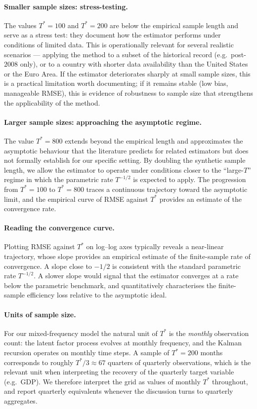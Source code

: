 \documentclass[11pt, a4paper, oneside]{article}
\begin{document}
\paragraph{Smaller sample sizes: stress-testing.}
The values $T^* = 100$ and $T^* = 200$ are below the empirical
sample length and serve as a stress test: they document how the
estimator performs under conditions of limited data. This is
operationally relevant for several realistic scenarios — applying
the method to a subset of the historical record (e.g.\ post-$2008$
only), or to a country with shorter data availability than the
United States or the Euro Area. If the estimator deteriorates
sharply at small sample sizes, this is a practical limitation
worth documenting; if it remains stable (low bias, manageable
RMSE), this is evidence of robustness to sample size that
strengthens the applicability of the method.

\paragraph{Larger sample sizes: approaching the asymptotic regime.}
The value $T^* = 800$ extends beyond the empirical length and
approximates the asymptotic behaviour that the literature predicts
for related estimators but does not formally establish for our
specific setting. By doubling the synthetic sample length, we
allow the estimator to operate under conditions closer to the
``large-$T$'' regime in which the parametric rate $T^{-1/2}$ is
expected to apply. The progression from $T^* = 100$ to
$T^* = 800$ traces a continuous trajectory toward the asymptotic
limit, and the empirical curve of RMSE against $T^*$ provides an
estimate of the convergence rate.

\paragraph{Reading the convergence curve.}
Plotting RMSE against $T^*$ on log--log axes typically reveals a
near-linear trajectory, whose slope provides an empirical estimate
of the finite-sample rate of convergence. A slope close to $-1/2$
is consistent with the standard parametric rate $T^{-1/2}$. A
slower slope would signal that the estimator converges at a rate
below the parametric benchmark, and quantitatively characterises
the finite-sample efficiency loss relative to the asymptotic
ideal.

\paragraph{Units of sample size.}
For our mixed-frequency model the natural unit of $T^*$ is the
\emph{monthly} observation count: the latent factor process
evolves at monthly frequency, and the Kalman recursion operates on
monthly time steps. A sample of $T^* = 200$ months corresponds to
roughly $T^*/3 \approx 67$ quarters of quarterly observations,
which is the relevant unit when interpreting the recovery of the
quarterly target variable (e.g.\ GDP). We therefore interpret the
grid as values of monthly $T^*$ throughout, and report quarterly
equivalents whenever the discussion turns to quarterly aggregates.
\end{document}
